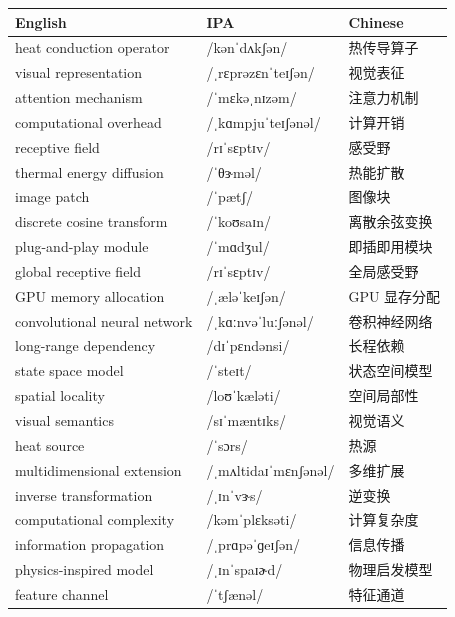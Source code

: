 \documentclass[UTF8,12pt,a4paper]{ctexart}
\providecommand{\zh}[1]{#1}
\begin{document}
\begin{tabular*}{\textwidth}{@{\extracolsep{\fill}}lll@{}}
\toprule
\textbf{English} & \textbf{IPA} & \textbf{Chinese} \\
\midrule
heat conduction operator & {\ipafont /kənˈdʌkʃən/} & \zh{热传导算子} \\
visual representation & {\ipafont /ˌrɛprəzɛnˈteɪʃən/} & \zh{视觉表征} \\
attention mechanism & {\ipafont /ˈmɛkəˌnɪzəm/} & \zh{注意力机制} \\
computational overhead & {\ipafont /ˌkɑmpjuˈteɪʃənəl/} & \zh{计算开销} \\
receptive field & {\ipafont /rɪˈsɛptɪv/} & \zh{感受野} \\
thermal energy diffusion & {\ipafont /ˈθɝməl/} & \zh{热能扩散} \\
image patch & {\ipafont /ˈpætʃ/} & \zh{图像块} \\
discrete cosine transform & {\ipafont /ˈkoʊsaɪn/} & \zh{离散余弦变换} \\
plug-and-play module & {\ipafont /ˈmɑdʒul/} & \zh{即插即用模块} \\
global receptive field & {\ipafont /rɪˈsɛptɪv/} & \zh{全局感受野} \\
GPU memory allocation & {\ipafont /ˌæləˈkeɪʃən/} & \zh{GPU 显存分配} \\
convolutional neural network & {\ipafont /ˌkɑːnvəˈluːʃənəl/} & \zh{卷积神经网络} \\
long-range dependency & {\ipafont /dɪˈpɛndənsi/} & \zh{长程依赖} \\
state space model & {\ipafont /ˈsteɪt/} & \zh{状态空间模型} \\
spatial locality & {\ipafont /loʊˈkæləti/} & \zh{空间局部性} \\
visual semantics & {\ipafont /sɪˈmæntɪks/} & \zh{视觉语义} \\
heat source & {\ipafont /ˈsɔrs/} & \zh{热源} \\
multidimensional extension & {\ipafont /ˌmʌltidaɪˈmɛnʃənəl/} & \zh{多维扩展} \\
inverse transformation & {\ipafont /ˌɪnˈvɝs/} & \zh{逆变换} \\
computational complexity & {\ipafont /kəmˈplɛksəti/} & \zh{计算复杂度} \\
information propagation & {\ipafont /ˌprɑpəˈɡeɪʃən/} & \zh{信息传播} \\
physics-inspired model & {\ipafont /ˌɪnˈspaɪɚd/} & \zh{物理启发模型} \\
feature channel & {\ipafont /ˈtʃænəl/} & \zh{特征通道} \\

\end{tabular*}
\end{document}
